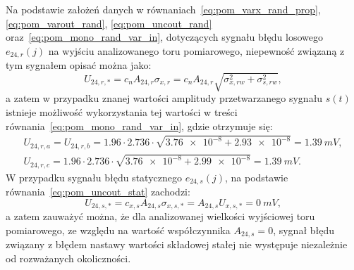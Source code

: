 Na podstawie założeń danych w równaniach~\eqref{eq:pom_varx_rand_prop}, \eqref{eq:pom_varout_rand}, \eqref{eq:pom_uncout_rand} oraz~\eqref{eq:pom_mono_rand_var_in}, dotyczących sygnału błędu losowego $e_{24,r}(j)$ na wyjściu analizowanego toru pomiarowego, niepewność związaną z tym sygnałem opisać można jako:
\begin{equation}
U_{24,r,*} = c_{n} A_{24,r} \sigma_{x,r} = c_{n} A_{24,r} \sqrt{\sigma_{x,rw}^{2} + \sigma_{s,rw}^{2}} \label{eq:pom_mono_unc_rand_all},
\end{equation}
a zatem w przypadku znanej wartości amplitudy przetwarzanego sygnału $s(t)$ istnieje możliwość wykorzystania tej wartości w treści równania~\eqref{eq:pom_mono_rand_var_in}, gdzie otrzymuje się:
\begin{gather}
U_{24,r,a} = U_{24,r,b} = \num{1.96} \cdot \num{2.736} \cdot \sqrt{\num{3.76e-8} + \num{2.93e-8}} = \qty{1.39}{mV} \label{eq:pom_mono_unc_rand_ab}, \\
U_{24,r,c} = \num{1.96} \cdot \num{2.736} \cdot \sqrt{\num{3.76e-8} + \num{2.99e-8}} = \qty{1.39}{mV} \label{eq:pom_mono_unc_rand_c}.
\end{gather}
W przypadku sygnału błędu statycznego $e_{24,s}(j)$, na podstawie równania~\eqref{eq:pom_uncout_stat} zachodzi:
\begin{equation}
U_{24,s,*} = c_{x,s} A_{24,s} \sigma_{x,s,*} = A_{24,s} U_{x,s,*} = \qty{0}{mV} \label{eq:pom_mono_unc_static_all},
\end{equation}
a zatem zauważyć można, że dla analizowanej wielkości wyjściowej toru pomiarowego, ze względu na wartość współczynnika $A_{24,s} = 0$, sygnał błędu związany z błędem nastawy wartości składowej stałej nie występuje niezależnie od rozważanych okoliczności.

